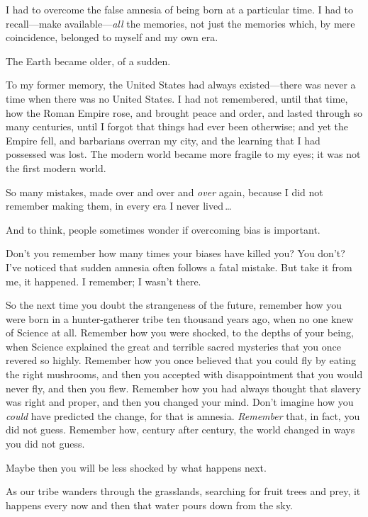 {
 I had to overcome the false amnesia of being born at a particular
time. I had to recall---make available---\textit{all} the memories, not
just the memories which, by mere coincidence, belonged to myself and my
own era.}

{
 The Earth became older, of a sudden.}

{
 To my former memory, the United States had always existed---there
was never a time when there was no United States. I had not remembered,
until that time, how the Roman Empire rose, and brought peace and
order, and lasted through so many centuries, until I forgot that things
had ever been otherwise; and yet the Empire fell, and barbarians
overran my city, and the learning that I had possessed was lost. The
modern world became more fragile to my eyes; it was not the first
modern world.}

{
 So many mistakes, made over and over and \textit{over} again,
because I did not remember making them, in every era I never lived\,\ldots}

{
 And to think, people sometimes wonder if overcoming bias is
important.}

{
 Don't you remember how many times your biases have
killed you? You don't? I've noticed
that sudden amnesia often follows a fatal mistake. But take it from me,
it happened. I remember; I wasn't there.}

{
 So the next time you doubt the strangeness of the future, remember
how you were born in a hunter-gatherer tribe ten thousand years ago,
when no one knew of Science at all. Remember how you were shocked, to
the depths of your being, when Science explained the great and terrible
sacred mysteries that you once revered so highly. Remember how you once
believed that you could fly by eating the right mushrooms, and then you
accepted with disappointment that you would never fly, and then you
flew. Remember how you had always thought that slavery was right and
proper, and then you changed your mind. Don't imagine
how you \textit{could} have predicted the change, for that is amnesia.
\textit{Remember} that, in fact, you did not guess. Remember how,
century after century, the world changed in ways you did not guess.}

{
 Maybe then you will be less shocked by what happens next.}

\myendsectiontext


\bigskip


{
 As our tribe wanders through the grasslands, searching for fruit
trees and prey, it happens every now and then that water pours down
from the sky. }

